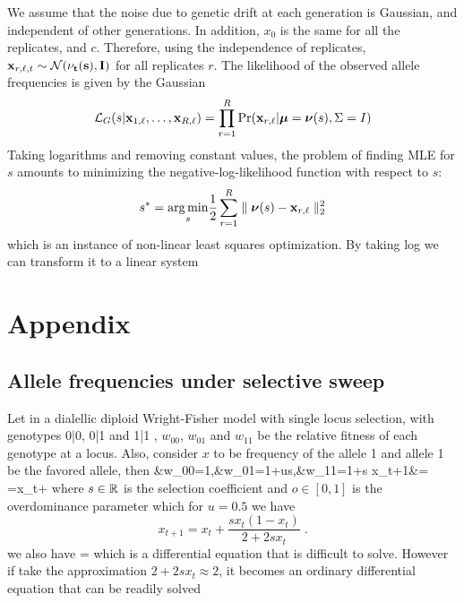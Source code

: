 \documentclass[11pt]{article}
\begin{document}
\newpage
We assume that the noise due to genetic drift at each generation is
Gaussian, and independent of other generations. In addition, $x_0$ is
the same for all the replicates, and $c$. Therefore, using the
independence of replicates, ${\mathbf x}_{r,\ell,t} \sim {\cal N}(\bf\nu_t(s),I)$
for all replicates $r$. The likelihood of the observed allele
frequencies is given by the Gaussian
\begin{equation}
	{\cal L}_G(s|{\mathbf x}_{1,\ell}, \dots,{\mathbf x}_{R,\ell}) = \prod_{r=1}^R \Pr({\mathbf x}_{r,\ell}| 
	{\boldsymbol\mu}={\boldsymbol\nu}(s),
	\Sigma= I) 
\end{equation}
Taking logarithms and removing constant values, the problem of finding
MLE for $s$ amounts to minimizing the negative-log-likelihood function
with respect to $s$: 
\begin{equation}
	s^*=\underset{s}{\arg \min} \frac{1}{2} \sum_{r=1}^R \parallel 
	{{\boldsymbol\nu}(s) -
		{\mathbf x}_{r,\ell}} \parallel_2^2
	\label{eq:nlls0}
\end{equation}
which is an instance of non-linear least squares optimization. By taking log we 
can transform it to a linear system






\newpage
\section{Appendix}
\subsection{Allele frequencies under selective sweep} \label{app:af}
Let in a dialellic diploid Wright-Fisher model with single locus selection, 
with genotypes 0|0, 0|1 and 1|1 , $w_{00}$, $w_{01}$ and  $w_{11}$ be the 
relative fitness of each genotype at a locus. Also, consider $x$ to be 
frequency of the allele 1 and allele 1 be the favored allele, then
\beq
&w_{00}=1,&w_{01}=1+us,&w_{11}=1+s
\eeq
\beq
x_{t+1}&= =x_t+
\eeq
where $s\in {\mathbb R}$ is the selection coefficient and $o\in[0,1]$ is the 
overdominance parameter which for $u=0.5$ we have
\begin{equation}
x_{t+1}=x_t+\frac{sx_t(1-x_t)}{2+2sx_t}\;.
\label{eq:hequalshalf}
\end{equation}
we also have
\beq
{} = 
\eeq
which is a differential equation that is difficult to solve. However if take 
the approximation $2+2sx_t \approx 2$, it becomes an ordinary differential 
equation that can be readily solved
\end{document}
